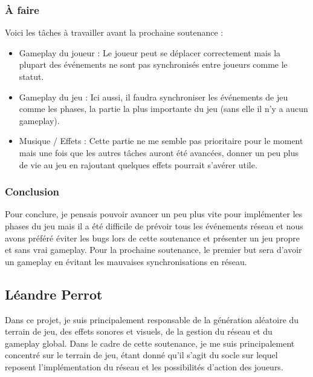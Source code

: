 \documentclass{article}
\begin{document}
\newpage
\subsubsection{À faire}

Voici les tâches à travailler avant la prochaine soutenance :

\begin{itemize}

\item Gameplay du joueur : Le joueur peut se déplacer correctement mais la plupart des événements ne sont pas synchronisés entre joueurs comme le statut.

\item Gameplay du jeu : Ici aussi, il faudra synchroniser les événements de jeu comme les phases, la partie la plus importante du jeu (sans elle il n'y a aucun gameplay).

\item Musique / Effets : Cette partie ne me semble pas prioritaire pour le moment mais une fois que les autres tâches auront été avancées, donner un peu plus de vie au jeu en rajoutant quelques effets pourrait s'avérer utile.

\end{itemize}

\subsubsection{Conclusion}

Pour conclure, je pensais pouvoir avancer un peu plus vite pour implémenter les phases du jeu mais il a été difficile de prévoir tous les événements réseau et nous avons préféré éviter les bugs lors de cette soutenance et présenter un jeu propre et sans vrai gameplay.
Pour la prochaine soutenance, le premier but sera d'avoir un gameplay en évitant les mauvaises synchronisations en réseau.


\newpage
\subsection{Léandre Perrot}
Dans ce projet, je suis principalement responsable de la génération aléatoire du terrain de jeu, des effets sonores et visuels, de la gestion du réseau et du gameplay global. Dans le cadre de cette soutenance, je me suis principalement concentré sur le terrain de jeu, étant donné qu'il s'agit du socle sur lequel reposent l'implémentation du réseau et les possibilités d'action des joueurs.
\end{document}
